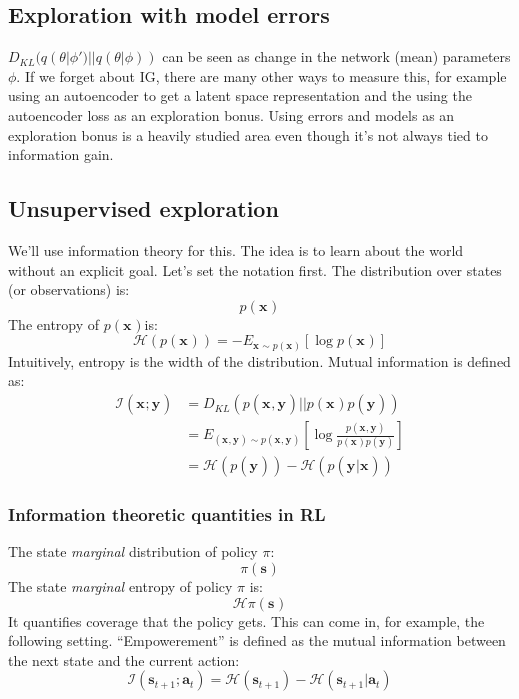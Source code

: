 \documentclass{report}
\begin{document}
\subsection{Exploration with model errors}
$ D_{KL}(q(\theta|\phi')||q(\theta|\phi))  $ can be seen as change in the network (mean) parameters $ \phi  $.
If we forget about IG, there are many other ways to measure this,
for example using an autoencoder to get a latent space representation and the using the autoencoder
loss as an exploration bonus.
Using errors and models as an exploration bonus is a heavily studied area even though it's
not always tied to information gain.

\subsection{Unsupervised exploration}
We'll use information theory for this.
The idea is to learn about the world without an explicit goal.
Let's set the notation first.
The distribution over states (or observations) is:
\begin{equation}
		p(\bm{x}_{})
\end{equation}
The entropy of $ p(\bm{x}_{})  $is:
\begin{equation}
		\mathcal{H}(p(\bm{x}_{})) = - E_{\bm{x}_{} \sim p(\bm{x}_{})} \left[ \log p(\bm{x}_{}) \right] 
\end{equation}
Intuitively, entropy is the width of the distribution.
Mutual information is defined as:
\begin{align}
		\mathcal{I}(\bm{x}_{};\bm{y}_{}) &= D_{KL}(p(\bm{x}_{}, \bm{y}_{})||p(\bm{x}_{})p(\bm{y}_{})) \\
										 &=
		E_{(\bm{x}_{}, \bm{y}_{}) \sim p(\bm{x}_{}, \bm{y}_{})}  \left[ \log \frac{p(\bm{x}_{},\bm{y}_{})}{p(\bm{x}_{})p(\bm{y}_{})}  \right] \\
 &= \mathcal{H}(p(\bm{y}_{})) - \mathcal{H}(p(\bm{y}_{}|\bm{x}_{}))
\end{align}

\subsubsection{Information theoretic quantities in RL}
The state \textit{marginal} distribution of policy $ \pi  $:
\begin{equation}
		\pi(\bm{s}_{})
\end{equation}
The state \textit{marginal} entropy of policy $ \pi  $ is:
\begin{equation}
		\mathcal{H}\pi(\bm{s}_{})
\end{equation}
It quantifies coverage that the policy gets.
This can come in, for example, the following setting.
``Empowerement'' is defined as the mutual information between the next state and the current action:
\begin{equation}
		\mathcal{I}(\bm{s}_{t+1}; \bm{a}_{t}) = 
		\mathcal{H}(\bm{s}_{t+1}) - \mathcal{H}(\bm{s}_{t+1}|\bm{a}_{t})
\end{equation}
\end{document}
